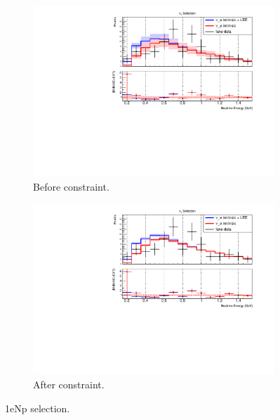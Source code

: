 \begin{figure}[H] 
\begin{center}
    \begin{subfigure}[b]{0.45\textwidth}
    \centering
    \includegraphics[width=1.00\textwidth]{Fakedata/set3/nue_numu_reco_e_H1_mc_fakedata_set3_nue_before_data_constraint.pdf}
    \caption{\label{fig:fakedata:set3:np_before_constrain} Before constraint.}
    \end{subfigure}
    \begin{subfigure}[b]{0.45\textwidth}
    \centering
    \includegraphics[width=1.00\textwidth]{Fakedata/set3/nue_numu_reco_e_H1_mc_fakedata_set3_univ_overlay_nue.pdf}
    \caption{\label{fig:fakedata:set3:np_after_constrain} After constraint.}
    \end{subfigure}
\caption{\label{fig:fakedata:set3:np_const} 1eNp selection.}
\end{center}
\end{figure}

